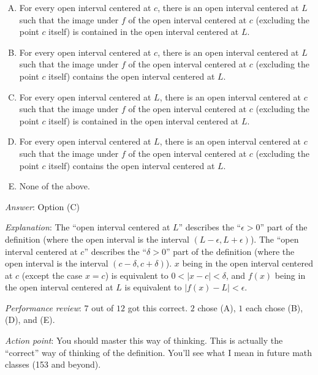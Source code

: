 \documentclass[10pt]{amsart}
\begin{document}
\begin{enumerate}
  \begin{enumerate}[(A)]
  \item For every open interval centered at $c$, there is an open
    interval centered at $L$ such that the image under $f$ of the open
    interval centered at $c$ (excluding the point $c$ itself) is
    contained in the open interval centered at $L$.
  \item For every open interval centered at $c$, there is an open
    interval centered at $L$ such that the image under $f$ of the open
    interval centered at $c$ (excluding the point $c$ itself) contains
    the open interval centered at $L$.
  \item For every open interval centered at $L$, there is an open
    interval centered at $c$ such that the image under $f$ of the open
    interval centered at $c$ (excluding the point $c$ itself) is
    contained in the open interval centered at $L$.
  \item For every open interval centered at $L$, there is an open
    interval centered at $c$ such that the image under $f$ of the open
    interval centered at $c$ (excluding the point $c$ itself) contains
    the open interval centered at $L$.
  \item None of the above.
  \end{enumerate}

  {\em Answer}: Option (C)

  {\em Explanation}: The ``open interval centered at $L$'' describes
  the ``$\epsilon > 0$'' part of the definition (where the open
  interval is the interval $(L - \epsilon, L + \epsilon)$). The ``open
  interval centered at $c$'' describes the ``$\delta > 0$'' part of
  the definition (where the open interval is the interval $(c -
  \delta, c + \delta)$). $x$ being in the open interval centered at
  $c$ (except the case $x = c$) is equivalent to $0 < |x - c| <
  \delta$, and $f(x)$ being in the open interval centered at $L$ is
  equivalent to $|f(x) - L| < \epsilon$.

  {\em Performance review}: $7$ out of $12$ got this correct. $2$
  chose (A), $1$ each chose (B), (D), and (E).

  {\em Action point}: You should master this way of thinking. This is
  actually the ``correct'' way of thinking of the definition. You'll
  see what I mean in future math classes (153 and beyond).

\end{enumerate}
\end{document}
